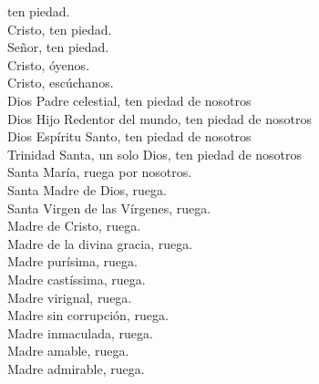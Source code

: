 \documentclass[10pt,a4paper,oneside]{book}
\begin{document}
\begin{minipage}[t]{0.475\textwidth}
      ten piedad.\\
      Cristo, ten piedad.\\
      Señor, ten piedad.\\
      Cristo, óyenos.\\
      Cristo, escúchanos.\\
      Dios Padre celestial, ten piedad de nosotros\\
      Dios Hijo Redentor del mundo, ten piedad de nosotros\\
      Dios Espíritu Santo, ten piedad de nosotros\\
      Trinidad Santa, un solo Dios, ten piedad de nosotros\\
      Santa María, ruega por nosotros.\\
      Santa Madre de Dios, ruega.\\
      Santa Virgen de las Vírgenes, ruega.\\
      Madre de Cristo, ruega.\\
      Madre de la divina gracia, ruega.\\
      Madre purísima, ruega.\\
      Madre castíssima, ruega.\\
      Madre virignal, ruega.\\
      Madre sin corrupción, ruega.\\
      Madre inmaculada, ruega.\\
      Madre amable, ruega.\\
      Madre admirable, ruega.
\end{minipage}
\end{document}
